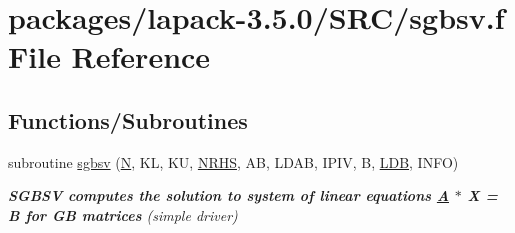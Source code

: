 \hypertarget{sgbsv_8f}{}\section{packages/lapack-\/3.5.0/\+S\+R\+C/sgbsv.f File Reference}
\label{sgbsv_8f}
\subsection*{Functions/\+Subroutines}
\begin{DoxyCompactItemize}
\item 
subroutine \hyperlink{group__realGBsolve_ga3656935309a19ed624052103572a4a47}{sgbsv} (\hyperlink{polmisc_8c_a0240ac851181b84ac374872dc5434ee4}{N}, K\+L, K\+U, \hyperlink{example__user_8c_aa0138da002ce2a90360df2f521eb3198}{N\+R\+H\+S}, A\+B, L\+D\+A\+B, I\+P\+I\+V, B, \hyperlink{example__user_8c_a50e90a7104df172b5a89a06c47fcca04}{L\+D\+B}, I\+N\+F\+O)
\begin{DoxyCompactList}\small\item\em {\bfseries  S\+G\+B\+S\+V computes the solution to system of linear equations \hyperlink{classA}{A} $\ast$ X = B for G\+B matrices} (simple driver) \end{DoxyCompactList}\end{DoxyCompactItemize}
